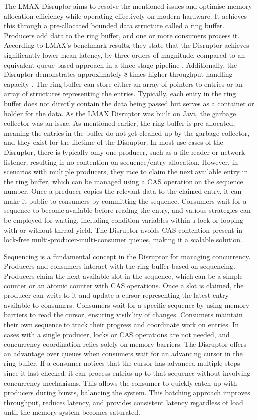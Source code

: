 \documentclass{article}
\theoremstyle{break}
\begin{document}
The LMAX Disruptor aims to resolve the mentioned issues and optimise memory allocation efficiency while operating effectively on modern hardware. It achieves this through a pre-allocated bounded data structure called a ring buffer. Producers add data to the ring buffer, and one or more consumers process it. According to LMAX's benchmark results, they state that the Disruptor achieves significantly lower mean latency, by three orders of magnitude, compared to an equivalent queue-based approach in a three-stage pipeline \cite{13}. Additionally, the Disruptor demonstrates approximately 8 times higher throughput handling capacity \cite{13}. The ring buffer can store either an array of pointers to entries or an array of structures representing the entries. Typically, each entry in the ring buffer does not directly contain the data being passed but serves as a container or holder for the data. As the LMAX Disruptor was built on Java, the garbage collector was an issue. As mentioned earlier, the ring buffer is pre-allocated, meaning the entries in the buffer do not get cleaned up by the garbage collector, and they exist for the lifetime of the Disruptor. In most use cases of the Disruptor, there is typically only one producer, such as a file reader or network listener, resulting in no contention on sequence/entry allocation. However, in scenarios with multiple producers, they race to claim the next available entry in the ring buffer, which can be managed using a CAS operation on the sequence number. Once a producer copies the relevant data to the claimed entry, it can make it public to consumers by committing the sequence. Consumers wait for a sequence to become available before reading the entry, and various strategies can be employed for waiting, including condition variables within a lock or looping with or without thread yield. The Disruptor avoids CAS contention present in lock-free multi-producer-multi-consumer queues, making it a scalable solution. 


Sequencing is a fundamental concept in the Disruptor for managing concurrency. Producers and consumers interact with the ring buffer based on sequencing. Producers claim the next available slot in the sequence, which can be a simple counter or an atomic counter with CAS operations. Once a slot is claimed, the producer can write to it and update a cursor representing the latest entry available to consumers. Consumers wait for a specific sequence by using memory barriers to read the cursor, ensuring visibility of changes. Consumers maintain their own sequence to track their progress and coordinate work on entries. In cases with a single producer, locks or CAS operations are not needed, and concurrency coordination relies solely on memory barriers. The Disruptor offers an advantage over queues when consumers wait for an advancing cursor in the ring buffer. If a consumer notices that the cursor has advanced multiple steps since it last checked, it can process entries up to that sequence without involving concurrency mechanisms. This allows the consumer to quickly catch up with producers during bursts, balancing the system. This batching approach improves throughput, reduces latency, and provides consistent latency regardless of load until the memory system becomes saturated.
\end{document}
